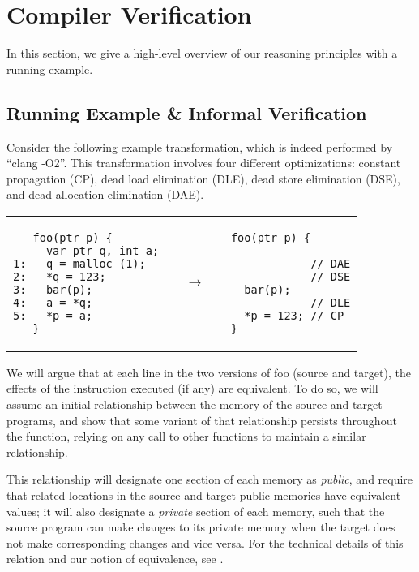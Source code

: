 \section{Compiler Verification}
\label{sec:intptrcast:compiler-verification}

In this section, we give a high-level overview of our reasoning principles
with a running example.

\subsection{Running Example \& Informal Verification}
\label{reasoning:running}

Consider the following example transformation, which is indeed
performed by ``clang -O2''.  This transformation involves four different optimizations: constant propagation (CP), dead load elimination
(DLE), dead store elimination (DSE), and dead allocation elimination
(DAE).
\begin{center}
\begin{tabular}{@{}l@{}l@{}l@{}}
\begin{lstlisting}
   foo(ptr p) {
     var ptr q, int a;
1:   q = malloc (1);
2:   *q = 123;
3:   bar(p);
4:   a = *q;
5:   *p = a;
   }
\end{lstlisting}
&
$\quad\rightarrow\quad$
&
\begin{lstlisting}
foo(ptr p) {

            // DAE
            // DSE
  bar(p);
            // DLE
  *p = 123; // CP
}
\end{lstlisting}
\end{tabular}
\end{center}

We will argue that at each line in the two versions of foo (source and target), the effects of the instruction executed (if any) are equivalent. To do so, we will assume an initial relationship between the memory of the source and target programs, and show that some variant of that relationship persists throughout the function, relying on any call to other functions to maintain a similar relationship. 

This relationship will designate one section of each memory as \emph{public}, and require that related locations in the source and target public memories have equivalent values; it will also designate a \emph{private} section of each memory, such that the source program can make changes to its private memory when the target does not make corresponding changes and vice versa. For the technical details of this relation and our notion of equivalence, see .

